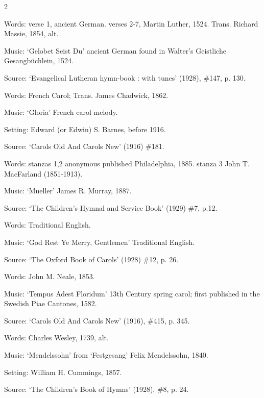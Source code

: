 \begin{multicols}{2}
\par\noindent
Words: verse 1, ancient German.  verses 2-7, Martin Luther, 1524.  Trans. Richard Massie, 1854, alt. 
\par\noindent
Music: `Gelobet Seist Du' ancient German found in Walter's Geistliche Gesangbüchlein, 1524. 
\par\noindent
Source: `Evangelical Lutheran hymn-book : with tunes' (1928), \#147, p. 130.\\%


\par\noindent
Words: French Carol; Trans. James Chadwick, 1862. 
\par\noindent
Music: `Gloria' French carol melody.
\par\noindent
Setting: Edward (or Edwin) S. Barnes, before 1916.
\par\noindent
Source: `Carols Old And Carols New' (1916) \#181.


\par\noindent
Words: stanzas 1,2 anonymous published Philadelphia, 1885.  stanza 3 John T. MacFarland (1851-1913). 
\par\noindent
Music: `Mueller' James R. Murray, 1887.
\par\noindent
Source: `The Children's Hymnal and Service Book' (1929) \#7, p.12.


\par\noindent
Words: Traditional English. 
\par\noindent
Music: `God Rest Ye Merry, Gentlemen' Traditional English.
\par\noindent
Source: `The Oxford Book of Carols' (1928) \#12, p. 26.


\par\noindent
Words: John M. Neale, 1853.
\par\noindent
Music: `Tempus Adest Floridum' 13th Century spring carol; first published in the Swedish Piae Cantones, 1582.
\par\noindent
Source: `Carols Old And Carols New' (1916), \#415, p. 345.


\par\noindent
Words: Charles Wesley, 1739, alt. 
\par\noindent
Music: `Mendelssohn' from `Festgesang' Felix Mendelssohn, 1840.
\par\noindent
Setting: William H. Cummings, 1857.
\par\noindent
Source: `The Children's Book of Hymns‎' (1928), \#8, p. 24.



\end{multicols}
